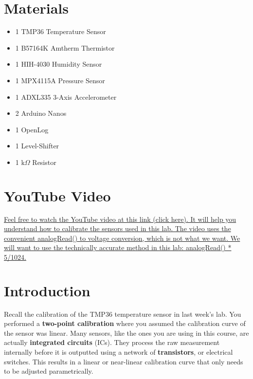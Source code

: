 \documentclass[12pt]{article}
\begin{document}
	\maketitle
	\thispagestyle{fancy}
	\section*{Materials}
	\begin{itemize}
	    \item 1 \quad TMP36 Temperature Sensor
	    \item 1 \quad B57164K Amtherm Thermistor
		\item 1 \quad HIH-4030 Humidity Sensor
		\item 1 \quad MPX4115A Pressure Sensor
		\item 1 \quad ADXL335 3-Axis Accelerometer
        \item 2 \quad Arduino Nanos
        \item 1 \quad OpenLog
        \item 1 \quad Level-Shifter
        \item 1  k$\Omega$ Resistor
	\end{itemize}
	
	\section*{YouTube Video}
	\href{https://www.youtube.com/watch?v=uCouP3qL1oc}{Feel free to watch the YouTube video at this link (click here). It will help you understand how to calibrate the sensors used in this lab. The video uses the convenient analogRead() to voltage conversion, which is not what we want. We will want to use the technically accurate method in this lab: analogRead() * 5/1024.}

	\section*{Introduction}
	Recall the calibration of the TMP36 temperature sensor in last week's lab. You performed a \textbf{two-point calibration} where you assumed the calibration curve of the sensor was linear. Many sensors, like the ones you are using in this course, are actually \textbf{integrated circuits} (ICs). They process the raw measurement internally before it is outputted using a network of \textbf{transistors}, or electrical switches. This results in a linear or near-linear calibration curve that only needs to be adjusted parametrically.\\
	
\end{document}

